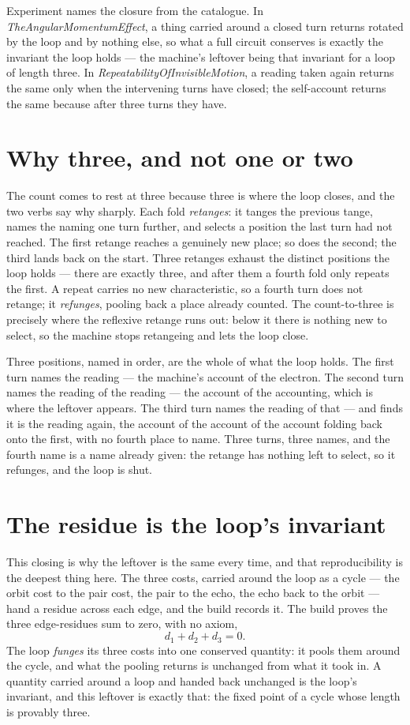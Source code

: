 Experiment names the closure from the catalogue.
In \emph{TheAngularMomentumEffect}, a thing carried around a closed turn returns rotated by the loop and by nothing else,
so what a full circuit conserves is exactly the invariant the loop holds --- the machine's leftover being that invariant
for a loop of length three.
In \emph{RepeatabilityOfInvisibleMotion}, a reading taken again returns the same only when the intervening turns have
closed; the self-account returns the same because after three turns they have.

\section{Why three, and not one or two}

The count comes to rest at three because three is where the loop closes, and the two verbs say why sharply.
Each fold \emph{retanges}: it tanges the previous tange, names the naming one turn further, and selects a position the
last turn had not reached.
The first retange reaches a genuinely new place; so does the second; the third lands back on the start.
Three retanges exhaust the distinct positions the loop holds --- there are exactly three, and after them a fourth fold
only repeats the first.
A repeat carries no new characteristic, so a fourth turn does not retange; it \emph{refunges}, pooling back a place
already counted.
The count-to-three is precisely where the reflexive retange runs out: below it there is nothing new to select, so the
machine stops retangeing and lets the loop close.

Three positions, named in order, are the whole of what the loop holds.
The first turn names the reading --- the machine's account of the electron.
The second turn names the reading of the reading --- the account of the accounting, which is where the leftover appears.
The third turn names the reading of that --- and finds it is the reading again, the account of the account of the account
folding back onto the first, with no fourth place to name.
Three turns, three names, and the fourth name is a name already given: the retange has nothing left to select, so it
refunges, and the loop is shut.

\section{The residue is the loop's invariant}

This closing is why the leftover is the same every time, and that reproducibility is the deepest thing here.
The three costs, carried around the loop as a cycle --- the orbit cost to the pair cost, the pair to the echo, the echo
back to the orbit --- hand a residue across each edge, and the build records it.
The build proves the three edge-residues sum to zero, with no axiom,
\[
  d_1 + d_2 + d_3 = 0 .
\]
The loop \emph{funges} its three costs into one conserved quantity: it pools them around the cycle, and what the pooling
returns is unchanged from what it took in.
A quantity carried around a loop and handed back unchanged is the loop's invariant, and this leftover is exactly that:
the fixed point of a cycle whose length is provably three.


